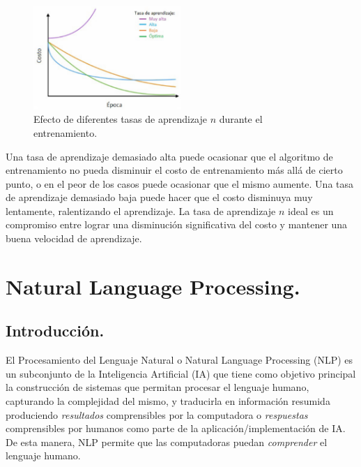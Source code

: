 \documentclass[12pt,a4paper]{article}
\begin{document}
\begin{sloppypar}
\begin{figure}[H]    %
 \centering
 \includegraphics[width=0.5\textwidth]{images/ANN/6-ANN.png}
  \captionsetup{justification=centering,margin=3cm}
 \caption{Efecto de diferentes tasas de aprendizaje $n$ durante el entrenamiento\cite{ANN_25}.} 
 \label{fig:ann_6}
\end{figure}

Una tasa de aprendizaje demasiado alta puede ocasionar que el algoritmo de entrenamiento no pueda disminuir el costo de entrenamiento más allá de cierto punto, o en el peor de los casos puede ocasionar que el mismo aumente. Una tasa de aprendizaje demasiado baja puede hacer que el costo disminuya muy lentamente, ralentizando el aprendizaje. La tasa de aprendizaje $n$ ideal es un compromiso entre lograr una disminución significativa del costo y mantener una buena velocidad de aprendizaje\cite{ANN_25}.
\cleardoublepage

\section{Natural Language Processing.}\label{4.NaturalLanguageProcessing}

\subsection{Introducción.}\label{Intro_NLP}

El Procesamiento del Lenguaje Natural o Natural Language Processing (NLP) es un subconjunto de la Inteligencia Artificial (IA) que tiene como objetivo principal la construcción de sistemas que permitan procesar el lenguaje humano, capturando la complejidad del mismo, y traducirla en información resumida produciendo \textit{resultados} comprensibles por la computadora o \textit{respuestas} comprensibles por humanos como parte de la aplicación/implementación de IA. De esta manera, NLP permite que las computadoras puedan \textit{comprender} el lenguaje humano.


\end{sloppypar}
\end{document}
